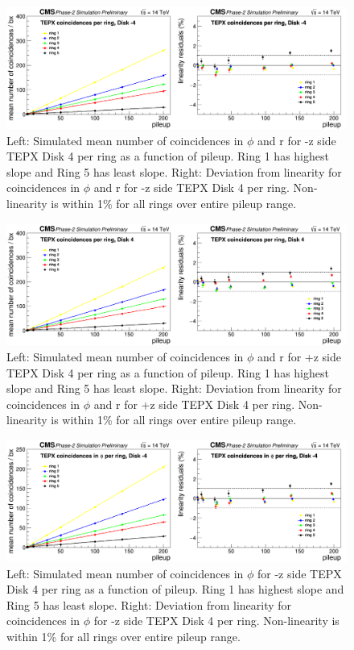 \begin{figure}[H]
  \centering
  \includegraphics[width=1\columnwidth]{./coincidencesperringD-4.png}
  \caption{Left: Simulated mean number of coincidences in $\phi$ and r for -z side TEPX Disk 4 per ring as a function of pileup. Ring 1 has highest slope and Ring 5 has least slope. Right: Deviation from linearity for coincidences in $\phi$ and r for -z side TEPX Disk 4 per ring. Non-linearity is within 1\% for all rings over entire pileup range.}
  \label{fig:CMS}
\end{figure}


\begin{figure}[H]
  \centering
  \includegraphics[width=1\columnwidth]{./coincidencesperringD+4.png}
  \caption{Left: Simulated mean number of coincidences in $\phi$ and r for +z side TEPX Disk 4 per ring as a function of pileup. Ring 1 has highest slope and Ring 5 has least slope. Right: Deviation from linearity for coincidences in $\phi$ and r for +z side TEPX Disk 4 per ring. Non-linearity is within 1\% for all rings over entire pileup range.}
  \label{fig:CMS}
\end{figure}






\begin{figure}[H]
  \centering
  \includegraphics[width=1\columnwidth]{./coincidencesinphiperringD-4.png}
  \caption{Left: Simulated mean number of coincidences in $\phi$ for -z side TEPX Disk 4 per ring as a function of pileup. Ring 1 has highest slope and Ring 5 has least slope. Right: Deviation from linearity for coincidences in $\phi$ for -z side TEPX Disk 4 per ring. Non-linearity is within 1\% for all rings over entire pileup range.}
  \label{fig:CMS}
\end{figure}

